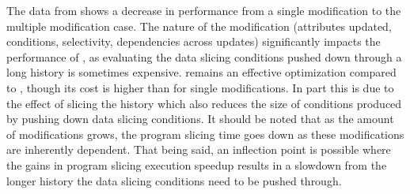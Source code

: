 The data from  shows a decrease in performance from a single modification to the multiple modification case. The nature of the modification (attributes updated, conditions, selectivity, dependencies across updates) significantly impacts the performance of \mrd, as evaluating the data slicing conditions pushed down through a long history is sometimes expensive. \mrdp remains an effective optimization compared to \mr, though its cost is higher than for single modifications. In part this is due to the effect of slicing the history which also reduces the size of conditions produced by pushing down  data slicing conditions. It should be noted that as the amount of modifications grows, the program slicing time goes down as these modifications are inherently dependent. That being said, an inflection point is possible where the gains in program slicing execution speedup results in a slowdown from the longer history the data slicing conditions need to be pushed through.


